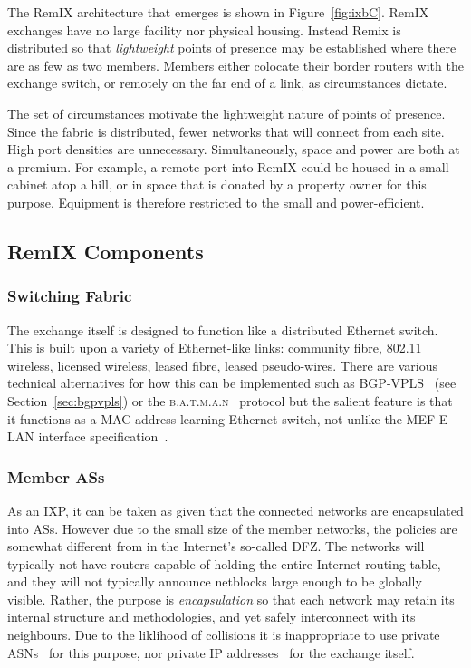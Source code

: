 The RemIX architecture that emerges is shown in Figure~\ref{fig:ixbC}. RemIX
exchanges have no large facility nor physical housing. Instead Remix is
distributed so that \emph{lightweight} points of presence may be established
where there are as few as two members. Members either colocate their border
routers with the exchange switch, or remotely on the far end of a link, as
circumstances dictate.

The set of circumstances motivate the lightweight nature of points of presence.
Since the fabric is distributed, fewer networks that will connect from each
site. High port densities are unnecessary. Simultaneously, space and power are
both at a premium. For example, a remote port into RemIX could be housed in a
small cabinet atop a hill, or in space that is donated by a property owner for
this purpose. Equipment is therefore restricted to the small and
power-efficient.


\subsection{RemIX Components}

\subsubsection{Switching Fabric}
The exchange itself is designed to function like a distributed
Ethernet switch. This is built upon a variety of
Ethernet-like links: community fibre, 802.11 wireless, licensed
wireless, leased fibre, leased pseudo-wires.  There are various
technical alternatives for how this can be implemented such as
BGP-VPLS~\cite{rfc4761} (see Section~\ref{sec:bgpvpls}) or the
\textsc{b.a.t.m.a.n}~\cite{johnson2008simple}
protocol but the salient feature is that it functions as a MAC address
learning Ethernet switch, not unlike the \ac{MEF} E-LAN interface
specification~\cite{mef62,mefes}.

\subsubsection{Member \acp{AS}}
As an \ac{IXP}, it can be taken as given that the connected networks
are encapsulated into \acp{AS}. However due to the small size of the
member networks, the policies are somewhat different from in the
Internet's so-called \ac{DFZ}. The networks will typically not have
routers capable of holding the entire Internet routing table, and they
will not typically announce netblocks large enough to be globally
visible. Rather, the purpose is \emph{encapsulation} so that each
network may retain its internal structure and methodologies, and yet
safely interconnect with its neighbours. Due to the
liklihood of collisions it is inappropriate to use private
\acp{ASN}~\cite{rfc6996} for this purpose, nor private IP
addresses~\cite{rfc1918} for the exchange itself.

